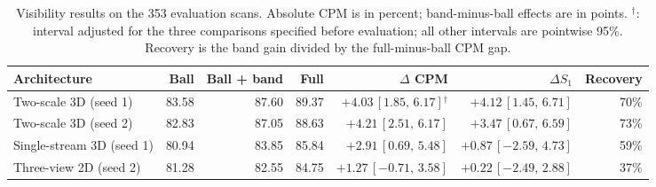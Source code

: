 \begin{table}[!t]
\centering
\small
\caption{Visibility results on the 353 evaluation scans. Absolute CPM is in percent; band-minus-ball effects are in points. $^\dagger$: interval adjusted for the three comparisons specified before evaluation; all other intervals are pointwise 95\%. Recovery is the band gain divided by the full-minus-ball CPM gap.}
\label{tab:visibility_supp}
\begin{tabular}{@{}lrrrrrr@{}}
\toprule
Architecture & Ball & Ball + band & Full & $\Delta$ CPM & $\Delta S_1$ & Recovery \\
\midrule
Two-scale 3D (seed 1) & 83.58 & 87.60 & 89.37 & $+4.03\,[1.85,\,6.17]$$^\dagger$ & $+4.12\,[1.45,\,6.71]$ & 70\% \\
Two-scale 3D (seed 2) & 82.83 & 87.05 & 88.63 & $+4.21\,[2.51,\,6.17]$ & $+3.47\,[0.67,\,6.59]$ & 73\% \\
Single-stream 3D (seed 1) & 80.94 & 83.85 & 85.84 & $+2.91\,[0.69,\,5.48]$ & $+0.87\,[-2.59,\,4.73]$ & 59\% \\
Three-view 2D (seed 2) & 81.28 & 82.55 & 84.75 & $+1.27\,[-0.71,\,3.58]$ & $+0.22\,[-2.49,\,2.88]$ & 37\% \\
\bottomrule
\end{tabular}
\end{table}
